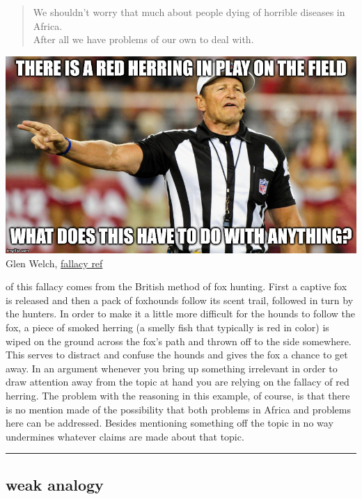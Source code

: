 \documentclass[justified]{tufte-book}
\newenvironment{argument}{\begin{quote}\normalsize}{\end{quote}}
\begin{document}
\begin{argument}
We shouldn't worry that much about people dying of horrible diseases in
Africa.\\
After all we have problems of our own to deal with.
\end{argument}

\begin{marginfigure}
\includegraphics{img/fallacies/red-herring.jpg}\\
Glen Welch, \href{https://twitter.com/fallacy_ref?lang=en}{fallacy ref}
\end{marginfigure}

 of this fallacy comes from the British method of fox hunting. First a captive fox is released and then a pack of foxhounds follow its scent trail, followed in turn by the hunters. In order to make it a little more difficult for the hounds to follow the fox, a piece of smoked herring (a smelly fish that typically is red in color) is wiped on the ground across the fox's path and thrown off to the side somewhere. This serves to distract and confuse the hounds and gives the fox a chance to get away. In an argument whenever you bring up something irrelevant in order to draw attention away from the topic at hand you are relying on the fallacy of red herring. The problem with the reasoning in this example, of course, is that there is no mention made of the possibility that both problems in Africa and problems here can be addressed. Besides mentioning something off the topic in no way undermines whatever claims are made about that topic.

\begin{center}\rule{0.5\linewidth}{\linethickness}\end{center}

\hypertarget{weak-analogy}{%
\subsection*{weak analogy}\label{weak-analogy}}
\end{document}
